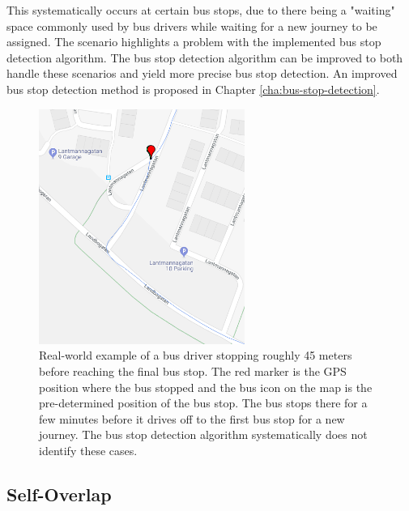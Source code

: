 This systematically occurs at certain bus stops, due to there being a "waiting" space commonly used by bus drivers while waiting for a new journey to be assigned.
The scenario highlights a problem with the implemented bus stop detection algorithm.
The bus stop detection algorithm can be improved to both handle these scenarios and yield more precise bus stop detection.
An improved bus stop detection method is proposed in Chapter \ref{cha:bus-stop-detection}.

\begin{figure}[t!]
    \centering
    \includegraphics[width=0.6\textwidth]{figures/stopped_before_end}
    \caption[Real-world example of a bus driver stopping roughly 45 meters before reaching the final bus stop]
    {\small Real-world example of a bus driver stopping roughly 45 meters before reaching the final bus stop.
    The red marker is the GPS position where the bus stopped and the bus icon on the map is the pre-determined position of the bus stop.
    The bus stops there for a few minutes before it drives off to the first bus stop for a new journey.
    The bus stop detection algorithm systematically does not identify these cases.}
    \label{fig:stopped-before-end}
\end{figure}

\subsection{Self-Overlap}


